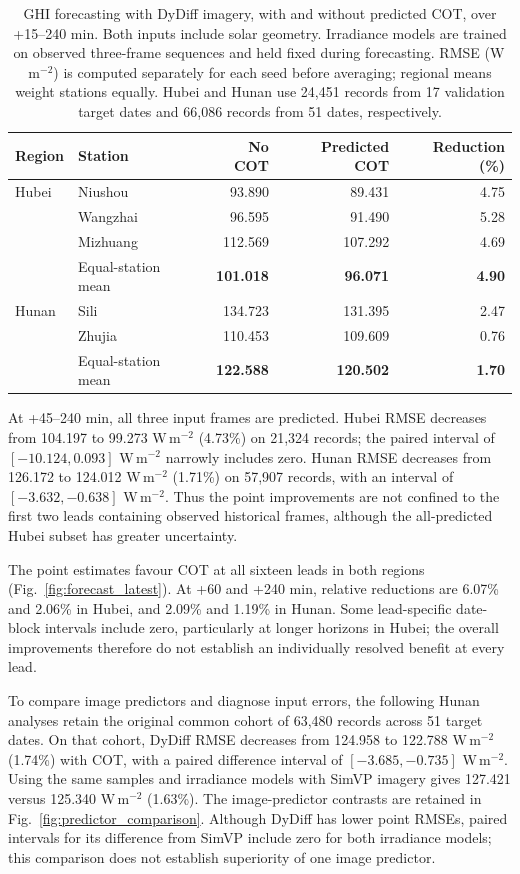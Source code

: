 \documentclass[11pt]{article}
\begin{document}
\begin{table}[!htbp]\centering\small
\caption{GHI forecasting with DyDiff imagery, with and without predicted COT, over +15--240 min. Both inputs include solar geometry. Irradiance models are trained on observed three-frame sequences and held fixed during forecasting. RMSE (W\,m$^{-2}$) is computed separately for each seed before averaging; regional means weight stations equally. Hubei and Hunan use 24,451 records from 17 validation target dates and 66,086 records from 51 dates, respectively.}\label{tab:regional_forecast}
\begin{tabularx}{\linewidth}{lXrrr}\toprule
Region & Station & No COT & Predicted COT & Reduction (\%)\\\midrule
Hubei & Niushou & 93.890 & 89.431 & 4.75\\
 & Wangzhai & 96.595 & 91.490 & 5.28\\
 & Mizhuang & 112.569 & 107.292 & 4.69\\
 & Equal-station mean & \textbf{101.018} & \textbf{96.071} & \textbf{4.90}\\\midrule
Hunan & Sili & 134.723 & 131.395 & 2.47\\
 & Zhujia & 110.453 & 109.609 & 0.76\\
 & Equal-station mean & \textbf{122.588} & \textbf{120.502} & \textbf{1.70}\\\bottomrule
\end{tabularx}
\end{table}

At +45--240 min, all three input frames are predicted. Hubei RMSE decreases from 104.197 to 99.273 W\,m$^{-2}$ (4.73\%) on 21,324 records; the paired interval of $[-10.124,0.093]$ W\,m$^{-2}$ narrowly includes zero. Hunan RMSE decreases from 126.172 to 124.012 W\,m$^{-2}$ (1.71\%) on 57,907 records, with an interval of $[-3.632,-0.638]$ W\,m$^{-2}$. Thus the point improvements are not confined to the first two leads containing observed historical frames, although the all-predicted Hubei subset has greater uncertainty.

The point estimates favour COT at all sixteen leads in both regions (Fig.~\ref{fig:forecast_latest}). At +60 and +240 min, relative reductions are 6.07\% and 2.06\% in Hubei, and 2.09\% and 1.19\% in Hunan. Some lead-specific date-block intervals include zero, particularly at longer horizons in Hubei; the overall improvements therefore do not establish an individually resolved benefit at every lead.

To compare image predictors and diagnose input errors, the following Hunan analyses retain the original common cohort of 63,480 records across 51 target dates. On that cohort, DyDiff RMSE decreases from 124.958 to 122.788 W\,m$^{-2}$ (1.74\%) with COT, with a paired difference interval of $[-3.685,-0.735]$ W\,m$^{-2}$. Using the same samples and irradiance models with SimVP imagery gives 127.421 versus 125.340 W\,m$^{-2}$ (1.63\%). The image-predictor contrasts are retained in Fig.~\ref{fig:predictor_comparison}. Although DyDiff has lower point RMSEs, paired intervals for its difference from SimVP include zero for both irradiance models; this comparison does not establish superiority of one image predictor.
\end{document}
